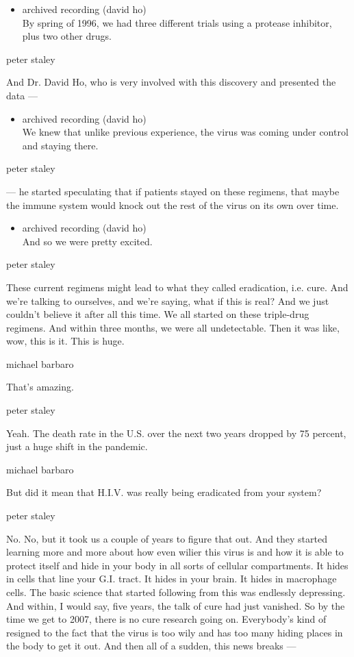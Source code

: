 \begin{itemize}
\tightlist
\item
  archived recording (david ho)\\
  By spring of 1996, we had three different trials using a protease
  inhibitor, plus two other drugs.
\end{itemize}

peter staley

And Dr. David Ho, who is very involved with this discovery and presented
the data ---

\begin{itemize}
\tightlist
\item
  archived recording (david ho)\\
  We knew that unlike previous experience, the virus was coming under
  control and staying there.
\end{itemize}

peter staley

--- he started speculating that if patients stayed on these regimens,
that maybe the immune system would knock out the rest of the virus on
its own over time.

\begin{itemize}
\tightlist
\item
  archived recording (david ho)\\
  And so we were pretty excited.
\end{itemize}

peter staley

These current regimens might lead to what they called eradication, i.e.
cure. And we're talking to ourselves, and we're saying, what if this is
real? And we just couldn't believe it after all this time. We all
started on these triple-drug regimens. And within three months, we were
all undetectable. Then it was like, wow, this is it. This is huge.

michael barbaro

That's amazing.

peter staley

Yeah. The death rate in the U.S. over the next two years dropped by 75
percent, just a huge shift in the pandemic.

michael barbaro

But did it mean that H.I.V. was really being eradicated from your
system?

peter staley

No. No, but it took us a couple of years to figure that out. And they
started learning more and more about how even wilier this virus is and
how it is able to protect itself and hide in your body in all sorts of
cellular compartments. It hides in cells that line your G.I. tract. It
hides in your brain. It hides in macrophage cells. The basic science
that started following from this was endlessly depressing. And within, I
would say, five years, the talk of cure had just vanished. So by the
time we get to 2007, there is no cure research going on. Everybody's
kind of resigned to the fact that the virus is too wily and has too many
hiding places in the body to get it out. And then all of a sudden, this
news breaks ---

